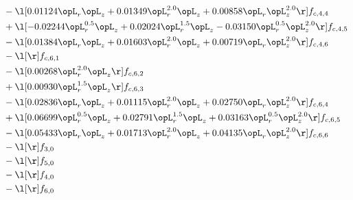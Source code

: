 \begin{alignat}{2}
& - \l[  0.01124 \opL_r \opL_z +  0.01349 \opL_r^{2.0} \opL_z +  0.00858 \opL_r \opL_z^{2.0}  \r] f_{c,4,4} \nonumber \\ 
& + \l[  -0.02244 \opL_r^{0.5} \opL_z +  0.02024 \opL_r^{1.5} \opL_z   -0.03150 \opL_r^{0.5} \opL_z^{2.0}  \r] f_{c,4,5} \nonumber \\ 
& - \l[  0.01384 \opL_r \opL_z +  0.01603 \opL_r^{2.0} \opL_z +  0.00719 \opL_r \opL_z^{2.0}  \r] f_{c,4,6} \nonumber \\ 
& - \l[  \r] f_{c,6,1} \nonumber \\ 
& - \l[  0.00268 \opL_r^{2.0} \opL_z  \r] f_{c,6,2} \nonumber \\ 
& + \l[  0.00930 \opL_r^{1.5} \opL_z  \r] f_{c,6,3} \nonumber \\ 
& - \l[  0.02836 \opL_r \opL_z +  0.01115 \opL_r^{2.0} \opL_z +  0.02750 \opL_r \opL_z^{2.0}  \r] f_{c,6,4} \nonumber \\ 
& + \l[  0.06699 \opL_r^{0.5} \opL_z +  0.02791 \opL_r^{1.5} \opL_z +  0.03163 \opL_r^{0.5} \opL_z^{2.0}  \r] f_{c,6,5} \nonumber \\ 
& - \l[  0.05433 \opL_r \opL_z +  0.01713 \opL_r^{2.0} \opL_z +  0.04135 \opL_r \opL_z^{2.0}  \r] f_{c,6,6} \nonumber \\ 
& - \l[  \r] f_{3,0} \nonumber \\ 
& - \l[  \r] f_{5,0} \nonumber \\ 
& - \l[  \r] f_{4,0} \nonumber \\ 
& - \l[  \r] f_{6,0} \nonumber \\ 
\end{alignat} 


